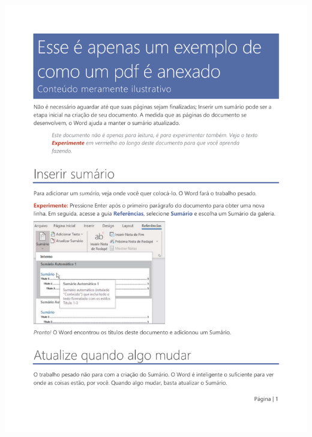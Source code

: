 \includegraphics[page=1,width=0.9\linewidth,height=0.9\textheight]{material-de-apoio/pdfs/storopoli-et-al_2021_Simulation-Driven_COVID-19.pdf}



\newpage